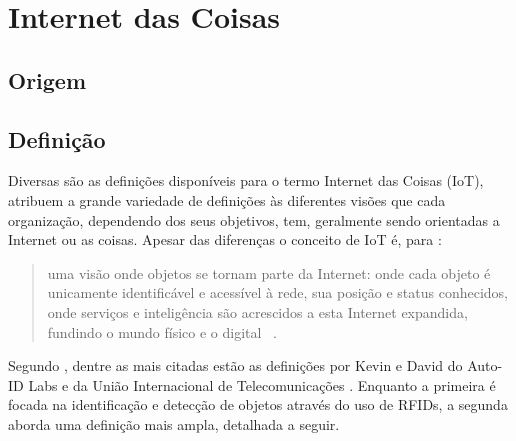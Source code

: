 \documentclass[twoside,english,brazilian]{UNISINOSmonografia}
\begin{document}
	\section{Internet das Coisas}
	
\subsection{Origem}

	
\subsection{Definição}
	
		Diversas são as definições disponíveis para o termo Internet das 
		Coisas (IoT),  atribuem a grande variedade de 
		definições às diferentes visões que cada organização, dependendo dos 
		seus objetivos, tem, geralmente sendo orientadas a Internet ou as 
		coisas. Apesar das diferenças o conceito de IoT é, para 
		:
		
		\begin{quote}
			uma visão onde objetos se tornam parte da Internet: onde cada 
			objeto é unicamente identificável e acessível à rede, sua posição 
			e status conhecidos, onde serviços e inteligência são acrescidos a 
			esta Internet expandida, fundindo o mundo físico e o digital~
			\cite{Coetzee2011}.
		\end{quote}
		
		Segundo , dentre as mais citadas estão as 
		definições por Kevin  e David 
		 do Auto-ID Labs e da União Internacional de 
		Telecomunicações . Enquanto a primeira é focada na 
		identificação e detecção de objetos através do uso de RFIDs, a segunda 
		aborda uma definição mais ampla, detalhada a seguir.
		
\end{document}
